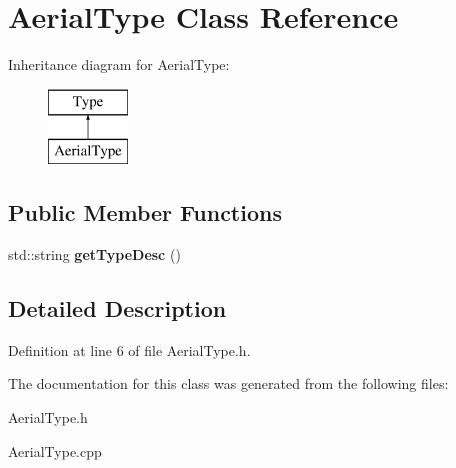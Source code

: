 \hypertarget{classAerialType}{}\section{Aerial\+Type Class Reference}
\label{classAerialType}
Inheritance diagram for Aerial\+Type\+:\begin{figure}[H]
\begin{center}
\leavevmode
\includegraphics[height=2.000000cm]{classAerialType}
\end{center}
\end{figure}
\subsection*{Public Member Functions}
\begin{DoxyCompactItemize}
\item 
\mbox{\label{classAerialType_a66dd43f2688de9a5eab9c6de0396e9cc}} 
std\+::string {\bfseries get\+Type\+Desc} ()
\end{DoxyCompactItemize}


\subsection{Detailed Description}


Definition at line 6 of file Aerial\+Type.\+h.



The documentation for this class was generated from the following files\+:\begin{DoxyCompactItemize}
\item 
Aerial\+Type.\+h\item 
Aerial\+Type.\+cpp\end{DoxyCompactItemize}
